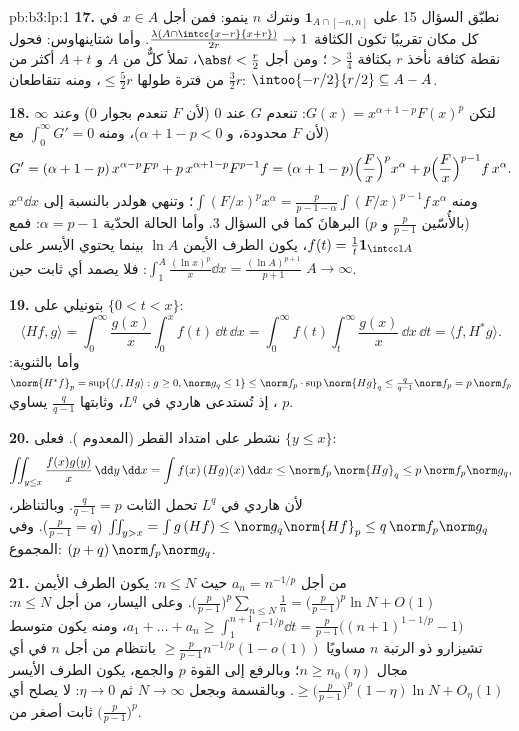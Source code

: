 \begin{solution}{pb:b3:lp:1}
\textbf{17.} نطبّق السؤال 15 على $\mathbf 1_{A\cap[-n,n]}$ ونترك $n$ ينمو: فمن
أجل $x \in A$ في كل مكان تقريبًا تكون الكثافة $\frac{\lambda(A\cap\intcc{x-r}{x+r})}{2r} \to 1$. وأما
شتاينهاوس: فحول نقطة كثافة نأخذ $r$ بكثافة $> \frac34$؛ ومن أجل
$\abs t < \frac r2$، تملأ كلٌّ من $A$ و $A + t$ أكثر من $\frac32r$ من فترة
طولها $\leq \frac52r$، ومنه تتقاطعان: $\intoo{-r/2}{r/2} \subseteq A - A$.

\textbf{18.} لتكن $G(x) = x^{\alpha+1-p}F(x)^p$: تنعدم $G$ عند $0$ (لأن $F$ تنعدم
بجوار $0$) وعند $\infty$ (لأن $F$ محدودة، و $\alpha + 1 - p < 0$)، ومنه
$\int_0^\infty G' = 0$ مع
\[
G' = (\alpha + 1 - p)\,x^{\alpha-p}F^p +
p\,x^{\alpha+1-p}F^{p-1}f
= (\alpha + 1 - p)\Bigl(\frac Fx\Bigr)^px^\alpha +
p\Bigl(\frac Fx\Bigr)^{p-1}f\,x^\alpha .
\]
ومنه $\int(F/x)^px^\alpha = \frac{p}{p-1-\alpha}
\int(F/x)^{p-1}f\,x^\alpha$؛ وتنهي هولدر بالنسبة إلى  $x^\alpha\dd x$
(بالأُسّين $\frac p{p-1}$ و $p$) البرهانَ كما في السؤال 3. وأما
الحالة الحدّية $\alpha = p - 1$: فمع $f(t) =
\frac1t\mathbf 1_{\intcc1A}$، يكون الطرف الأيمن
$\ln A$ بينما يحتوي الأيسر على $\int_1^A\frac{(\ln x)^p}x\dd x =
\frac{(\ln A)^{p+1}}{p+1}$: فلا يصمد أي ثابت حين
$A \to
\infty$.

\textbf{19.} بتونيلي على $\{0 < t < x\}$:
\[
\langle Hf, g\rangle =
\int_0^\infty\frac{g(x)}x\int_0^xf(t)\,\dd t\,\dd x
= \int_0^\infty f(t)\int_t^\infty\frac{g(x)}x\,\dd x\,\dd t
= \langle f, H^*g\rangle .
\]
وأما بالثنوية: $\norm{H^*f}_p = \sup\{\langle f, Hg\rangle : g
\geq 0, \norm g_q \leq 1\} \leq \norm f_p\cdot
\sup\norm{Hg}_q \leq \frac q{q-1}\norm f_p = p\,\norm f_p$، إذ تُستدعى هاردي في $L^q$، وثابتها
$\frac q{q-1}$ يساوي $p$.

\textbf{20.} نشطر على امتداد القطر (المعدوم ). فعلى
$\{y \leq
x\}$:
\[
\iint_{y\leq x}\frac{f(x)g(y)}{x}\,\dd y\,\dd x
= \int f(x)\,(Hg)(x)\,\dd x \leq \norm f_p\,\norm{Hg}_q
\leq p\,\norm f_p\norm g_q,
\]
لأن هاردي في $L^q$ تحمل الثابت $\frac q{q-1} =
p$. وبالتناظر، $\iint_{y>x} = \int g\,(Hf) \leq
\norm g_q\norm{Hf}_p \leq q\,\norm f_p\norm g_q$
($\frac
p{p-1} = q$). وفي المجموع: $(p + q)\,\norm f_p\norm g_q$.

\textbf{21.} من أجل $a_n = n^{-1/p}$ حيث $n \leq N$: يكون
الطرف الأيمن $\bigl(\frac p{p-1}\bigr)^p\sum_{n\leq N}\frac1n =
\bigl(\frac p{p-1}\bigr)^p\ln N + O(1)$. وعلى اليسار، من أجل $n
\leq N$: $a_1 + \dots + a_n \geq \int_1^{n+1}t^{-1/p}\dd t =
\frac{p}{p-1}\bigl((n+1)^{1-1/p} - 1\bigr)$،
ومنه يكون متوسط تشيزارو ذو الرتبة $n$ مساويًا $\geq \frac p{p-1}n^{-1/p}(1 -
o(1))$ بانتظام
من أجل $n$ في أي مجال $n \geq n_0(\eta)$؛ وبالرفع إلى القوة $p$ والجمع،
يكون الطرف الأيسر $\geq
\bigl(\frac p{p-1}\bigr)^p(1 - \eta)\ln N + O_\eta(1)$. وبالقسمة وبجعل $N \to \infty$ ثم
$\eta \to 0$: لا يصلح أي ثابت أصغر من $\bigl(\frac p{p-1}\bigr)^p$.


\end{solution}
